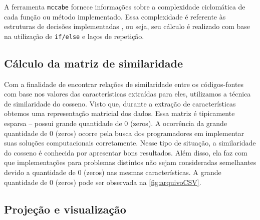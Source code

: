 %	
	
			A ferramenta \texttt{mccabe} \cite{mccabe2013} fornece informações sobre a
			complexidade ciclomática \cite{mccabe} de cada função ou método implementado.
			Essa complexidade é referente às estruturas de decisões implementadas \cite{mccabe},
			ou seja, seu cálculo é realizado com base na utilização de \texttt{if/else} e laços
			de repetição.
			
		
		\subsection{Cálculo da matriz de similaridade}
		
			Com a finalidade de encontrar relações de similaridade entre os códigos-fontes
			com base nos valores das características extraídas para eles, utilizamos a
			técnica de similaridade do cosseno. Visto que, durante a extração de
			características obtemos uma representação matricial dos dados. Essa matriz é
			tipicamente esparsa -- possui grande quantidade de 0 (zeros). 
			A ocorrência da grande quantidade de 0 (zeros) ocorre pela busca
			dos programadores em implementar suas soluções computacionais corretamente.
			Nesse tipo de situação, a similaridade do cosseno é conhecida por apresentar
			bons resultados.
			Além disso, ela faz com que implementações para problemas distintos não sejam
			consideradas semelhantes devido a quantidade de 0 (zeros) nas mesmas
			características. A grande quantidade de 0 (zeros) pode ser observada na
			\cref{fig:arquivoCSV}.
		
		
		\subsection{Projeção e visualização}
		
